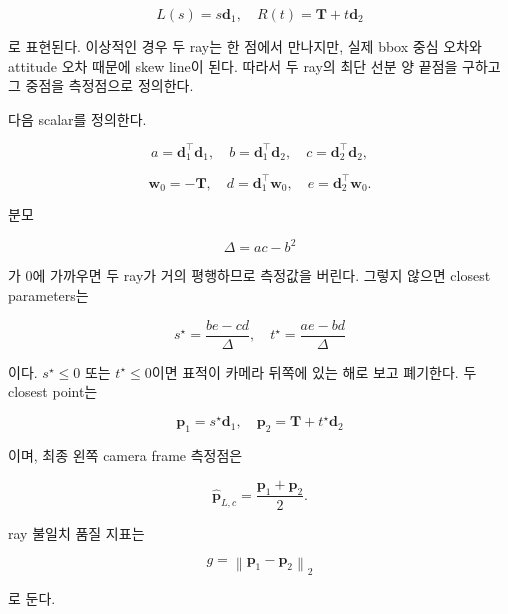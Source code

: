 \documentclass[10pt,conference]{IEEEtran}
\newcommand{\vect}[1]{\bm{#1}}
\newcommand{\norm}[1]{\left\lVert #1 \right\rVert_2}
\begin{document}
\begin{equation}
L(s)=s\vect{d}_1,
\quad
R(t)=\vect{T}+t\vect{d}_2
\end{equation}

로 표현된다.
이상적인 경우 두 ray는 한 점에서 만나지만, 실제 bbox 중심 오차와 attitude 오차 때문에 skew line이 된다.
따라서 두 ray의 최단 선분 양 끝점을 구하고 그 중점을 측정점으로 정의한다.

다음 scalar를 정의한다.

\begin{equation}
a=\vect{d}_1^\top\vect{d}_1,
\quad
b=\vect{d}_1^\top\vect{d}_2,
\quad
c=\vect{d}_2^\top\vect{d}_2,
\end{equation}

\begin{equation}
\vect{w}_0=-\vect{T},
\quad
d=\vect{d}_1^\top\vect{w}_0,
\quad
e=\vect{d}_2^\top\vect{w}_0.
\end{equation}

분모

\begin{equation}
\Delta = ac-b^2
\end{equation}

가 0에 가까우면 두 ray가 거의 평행하므로 측정값을 버린다.
그렇지 않으면 closest parameters는

\begin{equation}
s^\star = \frac{be-cd}{\Delta},
\quad
t^\star = \frac{ae-bd}{\Delta}
\label{eq:closest_parameters}
\end{equation}

이다.
$s^\star \le 0$ 또는 $t^\star \le 0$이면 표적이 카메라 뒤쪽에 있는 해로 보고 폐기한다.
두 closest point는

\begin{equation}
\vect{p}_1=s^\star\vect{d}_1,
\quad
\vect{p}_2=\vect{T}+t^\star\vect{d}_2
\end{equation}

이며, 최종 왼쪽 camera frame 측정점은

\begin{equation}
\hat{\vect{p}}_{L,c}
=
\frac{\vect{p}_1+\vect{p}_2}{2}.
\label{eq:left_camera_point}
\end{equation}

ray 불일치 품질 지표는

\begin{equation}
g = \norm{\vect{p}_1-\vect{p}_2}
\label{eq:closest_gap}
\end{equation}

로 둔다.
\end{document}

